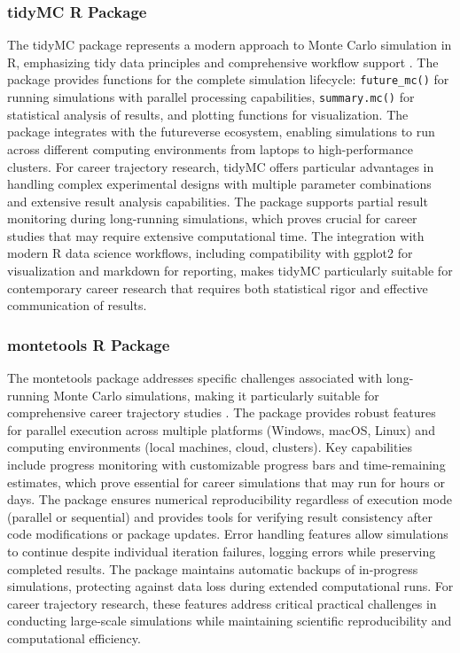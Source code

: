 \documentclass[main.tex]{subfiles}
\begin{document}
\subsubsection{tidyMC R Package}

The tidyMC package represents a modern approach to Monte Carlo simulation in R, emphasizing tidy data principles and comprehensive workflow support \parencite{tidymc2025}. The package provides functions for the complete simulation lifecycle: \texttt{future\_mc()} for running simulations with parallel processing capabilities, \texttt{summary.mc()} for statistical analysis of results, and plotting functions for visualization. The package integrates with the futureverse ecosystem, enabling simulations to run across different computing environments from laptops to high-performance clusters. For career trajectory research, tidyMC offers particular advantages in handling complex experimental designs with multiple parameter combinations and extensive result analysis capabilities. The package supports partial result monitoring during long-running simulations, which proves crucial for career studies that may require extensive computational time. The integration with modern R data science workflows, including compatibility with ggplot2 for visualization and markdown for reporting, makes tidyMC particularly suitable for contemporary career research that requires both statistical rigor and effective communication of results.

\subsubsection{montetools R Package}

The montetools package addresses specific challenges associated with long-running Monte Carlo simulations, making it particularly suitable for comprehensive career trajectory studies \parencite{montetools2023}. The package provides robust features for parallel execution across multiple platforms (Windows, macOS, Linux) and computing environments (local machines, cloud, clusters). Key capabilities include progress monitoring with customizable progress bars and time-remaining estimates, which prove essential for career simulations that may run for hours or days. The package ensures numerical reproducibility regardless of execution mode (parallel or sequential) and provides tools for verifying result consistency after code modifications or package updates. Error handling features allow simulations to continue despite individual iteration failures, logging errors while preserving completed results. The package maintains automatic backups of in-progress simulations, protecting against data loss during extended computational runs. For career trajectory research, these features address critical practical challenges in conducting large-scale simulations while maintaining scientific reproducibility and computational efficiency.
\end{document}
